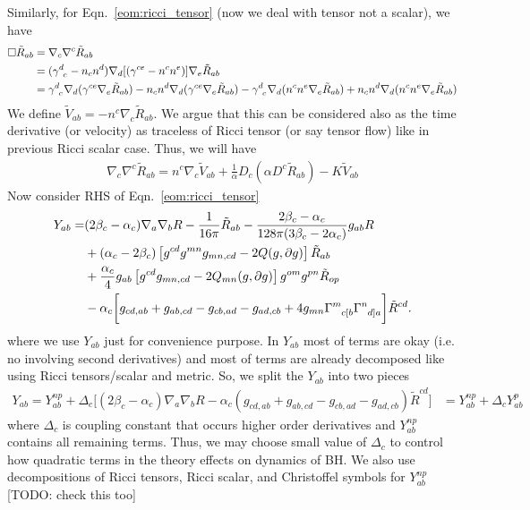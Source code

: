 \documentclass[a4paper,oneside,openany,11pt]{memoir}
\numberwithin{equation}{section} %
\newcommand{\TODO}[1]{{\color{red}[}{\color{red}TODO:} {\color{blue}#1}{\color{red}]}}
\begin{document}
Similarly, for Eqn.~\ref{eom:ricci_tensor} (now we deal with tensor not a scalar), we have
\begin{align}
\Box \tilde{R}_{ab} &= \nabla_c \nabla^c \tilde{R}_{ab} \nonumber \\
&= (\gamma\indices{^d_c} - n_c n^d) \nabla_d [(\gamma\indices{^{ce}} - n^c n^e)] \nabla_e \tilde{R}_{ab} \nonumber \\
&= \gamma\indices{^d_c} \nabla_d (\gamma^{ce} \nabla_e \tilde{R}_{ab}) - n_c n^d \nabla_d (\gamma^{ce} \nabla_e \tilde{R}_{ab})
- \gamma\indices{^d_c} \nabla_d (n^c n^e \nabla_e \tilde{R}_{ab}) + n_c n^d \nabla_d ( n^c n^e \nabla_e \tilde{R}_{ab}) \nonumber \\
\end{align}
We define $\tilde{V}_{ab} = - n^c \nabla_c \tilde{R}_{ab}$. We argue that this can be considered 
also as the time derivative (or velocity) as traceless of Ricci tensor (or say tensor flow) like in previous
Ricci scalar case. Thus, we will have
\begin{align}
\nabla_c \nabla^c \tilde{R}_{ab} = n^c \nabla_c \tilde{V}_{ab} + \frac{1}{\alpha} D_c (\alpha D^c \tilde{R}_{ab}) - K \tilde{V}_{ab}
\end{align}
Now consider RHS of Eqn.~\ref{eom:ricci_tensor}
\begin{align}
Y_{ab}= &(2 \beta_c - \alpha_c) \nabla_a \nabla_b R - \frac{1}{16 \pi} \tilde{R}_{ab} - \frac{2 \beta_c - \alpha_c}{128\pi(3\beta_c - 2 \alpha_c)} g_{ab} R \nonumber \\
&+(\alpha_c - 2 \beta_c)\left[g^{cd}g^{mn} g_{mn,cd} - 2 Q(g,\partial g) \right]\tilde{R}_{ab} \nonumber \\
&+\frac{\alpha_c}{4} g_{ab} \left[ g^{cd}g_{mn,cd} - 2 Q_{mn} (g,\partial g) \right] g^{om}g^{pn} \tilde{R}_{op} \nonumber \\
&- \alpha_c \bigg[ g_{cd,ab} + g_{ab,cd} - g_{cb,ad} - g_{ad,cb} +4 g_{mn} \Gamma\indices{^m_{c[b}} \Gamma\indices{^n_{d]a}} \bigg] \tilde{R}^{cd} .
\end{align}
where we use $Y_{ab}$ just for convenience purpose. In $Y_{ab}$ most of terms are okay (i.e. no involving second derivatives) 
and most of terms are already decomposed like using Ricci tensors/scalar and metric. So, we split the $Y_{ab}$ into two pieces
\begin{align}
Y_{ab} = Y^{np}_{ab} + \Delta_c \big[(2 \beta_c - \alpha_c) \nabla_a \nabla_b R - \alpha_c (g_{cd,ab} + g_{ab,cd} - g_{cb,ad} - g_{ad,cb}) \tilde{R}^{cd} \big]
&= Y^{np}_{ab} + \Delta_c Y^{p}_{ab}
\end{align}
where $\Delta_c$ is coupling constant that occurs higher order derivatives and $Y^{np}_{ab}$ contains all remaining terms.
Thus, we may choose small value of $\Delta_c$ to control how quadratic terms in the theory effects on dynamics of BH.
We also use decompositions of Ricci tensors, Ricci scalar, and Christoffel symbols for $Y^{np}_{ab}$ \TODO{check this too}
\end{document}
